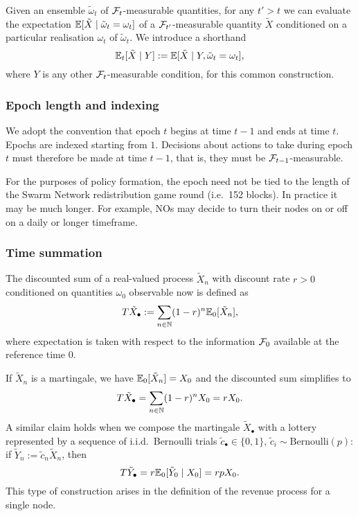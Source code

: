Given an ensemble $\tilde\omega_t$ of $\mathcal{F}_t$-measurable quantities, for any $t'>t$ we can evaluate the expectation $\mathbb{E}[\tilde{X}\mid \tilde\omega_t=\omega_t]$ of a $\mathcal{F}_{t'}$-measurable quantity $\tilde{X}$ conditioned on a particular realisation $\omega_t$ of $\tilde\omega_t$.
%
We introduce a shorthand
\[
  \mathbb{E}_t[\tilde{X}\mid Y] := \mathbb{E}[\tilde{X}\mid Y,\tilde\omega_t=\omega_t],
\]
%
where $Y$ is any other $\mathcal{F}_t$-measurable condition, for this common construction.


\subsubsection{Epoch length and indexing}
%
We adopt the convention that epoch $t$ begins at time $t-1$ and ends at time $t$.
%
Epochs are indexed starting from $1$.
%
Decisions about actions to take during epoch $t$ must therefore be made at time $t-1$, that is, they must be $\mathcal{F}_{t-1}$-measurable.

For the purposes of policy formation, the epoch need not be tied to the length of the Swarm Network redistribution game round (i.e.~152 blocks).
%
In practice it may be much longer.
%
For example, NOs may decide to turn their nodes on or off on a daily or longer timeframe.

\subsubsection{Time summation}
%
The discounted sum of a real-valued process $\tilde{X}_n$ with discount rate $r>0$ conditioned on quantities $\omega_0$ observable now is defined as
\[
  T\tilde{X}_\bullet := \sum_{n\in\mathbb{N}}(1-r)^n\mathbb{E}_0[\tilde{X}_n],
\]
where expectation is taken with respect to the information $\mathcal{F}_0$ available at the reference time $0$.

If $\tilde{X}_n$ is a martingale, we have $\mathbb{E}_0[\tilde{X}_n]=X_0$ and the discounted sum simplifies to 
%
\[
  T\tilde{X}_\bullet = \sum_{n\in\mathbb{N}} (1-r)^n X_0 = rX_0.
\]
%
A similar claim holds when we compose the martingale $\tilde{X}_\bullet$ with a lottery represented by a sequence of i.i.d.~Bernoulli trials $\tilde{c}_\bullet\in\{0,1\}$, $\tilde{c}_i\sim \mathrm{Bernoulli}(p)$: if $\tilde{Y}_n := \tilde{c}_n\tilde{X}_n$, then
%
\[
  T\tilde{Y}_\bullet = r\mathbb{E}_0[\tilde{Y}_0 \mid X_0] = rp X_0.
\]
%
This type of construction arises in the definition of the revenue process for a single node.

